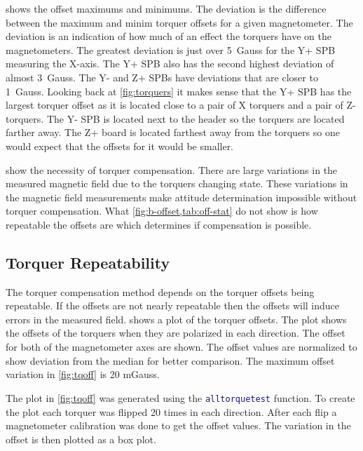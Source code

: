  shows the offset maximums and minimums. The deviation is the difference between the maximum and minim torquer offsets for a given magnetometer. The deviation is an indication of how much of an effect the torquers have on the magnetometers. The greatest deviation is just over 5~Gauss for the Y+ \ac{SPB} measuring the X-axis. The Y+ \ac{SPB} also has the second highest deviation of almost 3~Gauss. The Y- and Z+ \acp{SPB} have deviations that are closer to 1~Gauss. Looking back at \cref{fig:torquers} it makes sense that the Y+ \ac{SPB} has the largest torquer offset as it is located close to a pair of X torquers and a pair of Z-torquers. The Y- \ac{SPB} is located next to the header so the torquers are located farther away. The Z+ board is located farthest away from the torquers so one would expect that the offsets for it would be smaller.


 show the necessity of torquer compensation. There are large variations in the measured magnetic field due to the torquers changing state. These variations in the magnetic field measurements make attitude determination impossible without torquer compensation. What \cref{fig:b-offset,tab:off-stat} do not show is how repeatable the offsets are which determines if compensation is possible. 

\subsection{Torquer Repeatability}

The torquer compensation method depends on the torquer offsets being repeatable. If the offsets are not nearly repeatable then the offsets will induce errors in the measured field.  shows a plot of the torquer offsets. The plot shows the offsets of the torquers when they are polarized in each direction. The offset for both of the magnetometer axes are shown. The offset values are normalized to show deviation from the median for better comparison. The maximum offset variation in \cref{fig:tqoff} is 20 mGauss.

The plot in \cref{fig:tqoff} was generated using the \lstinline[style=code,language=Matlab]$alltorquetest$ function. To create the plot each torquer was flipped 20 times in each direction. After each flip a magnetometer calibration was done to get the offset values. The variation in the offset is then plotted as a box plot.


